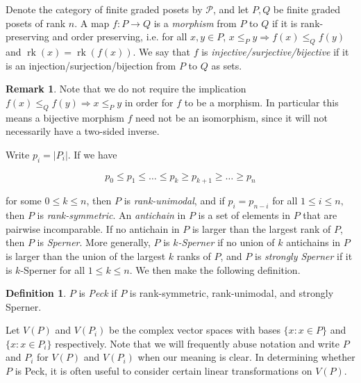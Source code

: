 \documentclass[10 pt]{amsart}
\theoremstyle{plain}
\theoremstyle{definition}
\newtheorem{defn}[thm]{Definition}
\newtheorem{rem}[thm]{Remark}
\theoremstyle{remark}
\numberwithin{equation}{section}
\newcommand\rk{\operatorname{rk}}
\begin{document}
Denote the category of finite graded posets by $\mathcal{P}$, and let $P,Q$ be finite graded posets of rank $n$.  A map $f\colon P\rightarrow Q$ is a \textit{morphism} from $P$ to $Q$ if it is rank-preserving and order preserving, i.e. for all $x,y\in P$, $x\le_P y \Rightarrow f(x)\le_Q f(y)$ and $\rk(x) = \rk(f(x))$.  We say that $f$ is \textit{injective/surjective/bijective} if it is an injection/surjection/bijection from $P$ to $Q$ as sets.

\begin{rem}\label{rem:bijective_morphism_not_isomorphism}
Note that we do not require the implication $f(x)\le_Q f(y) \Rightarrow x\le_P y$ in order for $f$ to be a morphism.  In particular this means a bijective morphism $f$ need not be an isomorphism, since it will not necessarily have a two-sided inverse.  
\end{rem}

Write $p_i = |P_i|$.  If we have

$$p_0\le p_1\le \ldots \le p_k \ge p_{k+1} \ge\ldots \ge p_n$$

\noindent for some $0\le k\le n$, then $P$ is \textit{rank-unimodal}, and if $p_i = p_{n-i}$ for all $1\le i\le n,$ then $P$ is \textit{rank-symmetric}.  An \textit{antichain} in $P$ is a set of elements in $P$ that are pairwise incomparable.  If no antichain in $P$ is larger than the largest rank of $P$, then $P$ is \textit{Sperner}.  More generally, $P$ is \textit{$k$-Sperner} if no union of $k$ antichains in $P$ is larger than the union of the largest $k$ ranks of $P$, and $P$ is \textit{strongly Sperner} if it is $k$-Sperner for all $1\le k\le n$.  We then make the following definition.

\begin{defn}
$P$ is \textit{Peck} if $P$ is rank-symmetric, rank-unimodal, and strongly Sperner.
\end{defn}


Let $V(P)$ and $V(P_i)$ be the complex vector spaces with bases $\{x :x\in P\}$ and $\{x :x\in P_i\}$ respectively.  Note that we will frequently abuse notation and write $P$ and $P_i$ for $V(P)$ and $V(P_i)$ when our meaning is clear.  In determining whether $P$ is Peck, it is often useful to consider certain linear transformations on $V(P)$.
\end{document}
